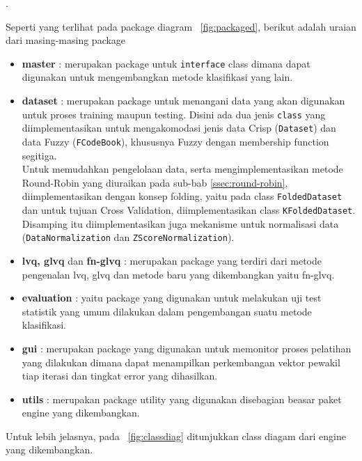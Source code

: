 .

\noindent Seperti yang terlihat pada package diagram \pic~\ref{fig:packaged},
berikut adalah uraian dari masing-masing package
\begin{itemize}
  \item \textbf{master} : merupakan package untuk \texttt{interface} class
  dimana dapat digunakan untuk mengembangkan metode klasifikasi yang lain.
  \item \textbf{dataset} : merupakan package untuk menangani data yang akan
  digunakan untuk proses training maupun testing. Disini ada dua jenis
  \texttt{class} yang diimplementasikan untuk mengakomodasi jenis data Crisp
  (\texttt{Dataset}) dan data Fuzzy (\texttt{FCodeBook}), khususnya Fuzzy dengan
  membership function segitiga. \\ 
  Untuk memudahkan pengelolaan data, serta mengimplementasikan metode
  Round-Robin yang diuraikan pada sub-bab \ref{ssec:round-robin},
  diimplementasikan dengan konsep folding, yaitu pada class
  \texttt{FoldedDataset} dan untuk tujuan Cross Validation, diimplementasikan
  class \texttt{KFoldedDataset}. Disamping itu diimplementasikan juga mekanisme
  untuk normalisasi data (\texttt{DataNormalization}  dan
  \texttt{ZScoreNormalization}).
  \item \textbf{lvq, glvq} dan \textbf{fn-glvq} : merupakan package yang
  terdiri dari metode pengenalan lvq, glvq dan metode baru yang dikembangkan
  yaitu fn-glvq.
  \item \textbf{evaluation} : yaitu package yang digunakan untuk melakukan uji
  test statistik yang umum dilakukan dalam pengembangan suatu metode klasifikasi.
  \item \textbf{gui} : merupakan package yang digunakan untuk memonitor proses
  pelatihan yang dilakukan dimana dapat menampilkan perkembangan vektor pewakil
  tiap iterasi dan tingkat error yang dihasilkan.
  \item \textbf{utils} : merupakan package utility yang digunakan disebagian
  beasar paket engine yang dikembangkan.
\end{itemize} 

Untuk lebih jelasnya, pada \pic~\ref{fig:classdiag} ditunjukkan class diagam
dari engine yang dikembangkan.

\clearpage



